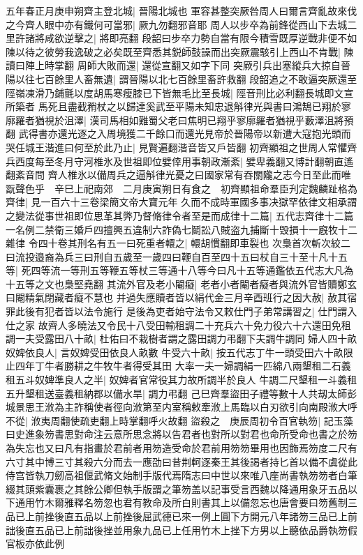 五年春正月庚申朔齊主登北城|{
	晉陽北城也}
軍容甚整突厥咎周人曰爾言齊亂故來伐之今齊人眼中亦有鐵何可當邪|{
	厥九勿翻邪音耶}
周人以步卒為前鋒從西山下去城二里許諸將咸欲逆擊之|{
	將即亮翻}
段韶曰步卒力勢自當有限今積雪既厚逆戰非便不如陳以待之彼勞我逸破之必矣既至齊悉其鋭師鼓譟而出突厥震駭引上西山不肯戰|{
	陳讀曰陣上時掌翻}
周師大敗而還|{
	還從宣翻又如字下同}
突厥引兵出塞縱兵大掠自晉陽以往七百餘里人畜無遺|{
	謂晉陽以北七百餘里畜許救翻}
段韶追之不敢逼突厥還至陘嶺凍滑乃鋪氈以度胡馬寒瘦膝已下皆無毛比至長城|{
	陘音刑比必利翻長城即文宣所築者}
馬死且盡截矟杖之以歸達奚武至平陽未知忠退斛律光與書曰鴻鵠已翔於寥廓羅者猶視於沮澤|{
	漢司馬相如難蜀父老曰焦明已翔乎寥廓羅者猶視乎藪澤沮將預翻}
武得書亦還光逐之入周境獲二千餘口而還光見帝於晉陽帝以新遭大寇抱光頭而哭任城王湝進曰何至於此乃止|{
	見賢遍翻湝音皆又戶皆翻}
初齊顯祖之世周人常懼齊兵西度每至冬月守河椎氷及世祖即位嬖倖用事朝政漸紊|{
	嬖卑義翻又博計翻朝直遙翻紊音問}
齊人椎氷以備周兵之逼斛律光憂之曰國家常有吞關隴之志今日至此而唯翫聲色乎　辛巳上祀南郊　二月庚寅朔日有食之　初齊顯祖命羣臣刋定魏麟趾格為齊律|{
	見一百六十三卷梁簡文帝大寶元年}
久而不成時軍國多事决獄罕依律文相承謂之變法從事世祖即位思革其弊乃督脩律令者至是而成律十二篇|{
	五代志齊律十二篇一名例二禁衛三婚戶四擅興五違制六詐偽七鬬訟八賊盗九捕斷十毁損十一廐牧十二雜律}
令四十卷其刑名有五一曰死重者轘之|{
	轘胡慣翻即車裂也}
次梟首次斬次絞二曰流投邉裔為兵三曰刑自五歲至一歲四曰鞭自百至四十五曰杖自三十至十凡十五等|{
	死四等流一等刑五等鞭五等杖三等通十八等今曰凡十五等通鑑依五代志大凡為十五等之文也梟堅堯翻}
其流外官及老小閹癡|{
	老者小者閹者癡者與流外官皆贖鄭玄曰閹精氣閉藏者癡不慧也}
并過失應贖者皆以絹代金三月辛酉班行之因大赦|{
	赦其宿罪此後有犯者皆以法令施行}
是後為吏者始守法令又敕仕門子弟常講習之|{
	仕門謂入仕之家}
故齊人多曉法又令民十八受田輸租調二十充兵六十免力役六十六還田免租調一夫受露田八十畝|{
	杜佑曰不栽樹者謂之露田調力弔翻下夫調牛調同}
婦人四十畝奴婢依良人|{
	言奴婢受田依良人畝數}
牛受六十畝|{
	按五代志丁牛一頭受田六十畝限止四年丁牛者勝耕之牛牧牛者得受其田}
大率一夫一婦調絹一匹綿八兩墾租二石義租五斗奴婢準良人之半|{
	奴婢者官常役其力故所調半於良人}
牛調二尺墾租一斗義租五升墾租送臺義租納郡以備水旱|{
	調力弔翻}
己巳齊羣盜田子禮等數十人共刼太師彭城景思王浟為主詐稱使者徑向浟第至内室稱敕牽浟上馬臨以白刃欲引向南殿浟大呼不從|{
	浟夷周翻使疏吏翻上時掌翻呼火故翻}
盜殺之　庚辰周初令百官執笏|{
	記玉藻曰史進象笏書思對命注云意所思念將以告君者也對所以對君也命所受命也書之於笏為失忘也又曰凡有指畫於君前者用笏造受命於君前用笏笏畢用也因飾焉笏度二尺有六寸其中博三寸其殺六分而去一應劭曰昔荆軻逐秦王其後謁者持匕首以備不虞從此侍宫皆執刀劒高祖偃武脩文始制手版代焉隋志曰中世以來唯八座尚書執笏笏者白筆綴其頭紫囊裹之其餘公卿但執手版謂之筆笏盖以記事受言西魏以降通用象牙五品以下通用竹木爾雅釋名笏忽也君有教命及所白則書其上以備忽忘也唐會要曰笏舊制三品已上前挫後直五品以上前挫後屈武德已來一例上圓下方開元八年諸笏三品已上前詘後直五品已上前詘後挫並用象九品已上任用竹木上挫下方男以上聽依品爵執笏假官板亦依此例}
